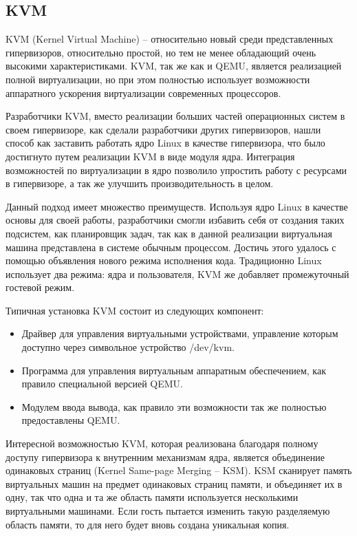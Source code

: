 \subsection{KVM}

KVM (Kernel Virtual Machine) -- относительно новый среди представленных гипервизоров,
относительно простой, но тем не менее обладающий очень высокими характеристиками. 
KVM, так же как и QEMU,
является реализацией полной виртуализации, но при этом полностью использует возможности 
аппаратного ускорения виртуализации современных процессоров.
\cite{Habib:2008:VK:1344209.1344217}

Разработчики KVM, вместо реализации больших частей операционных систем в своем
гипервизоре, как сделали разработчики других гипервизоров, нашли способ как заставить
работать ядро Linux в качестве гипервизора, что было достигнуто путем реализации
KVM в виде модуля ядра. Интеграция возможностей по виртуализации в ядро позволило
упростить работу с ресурсами в гипервизоре, а так же улучшить производительность в целом.
 
Данный подход имеет множество преимуществ. Используя ядро Linux в качестве основы для
своей работы, разработчики смогли избавить себя от создания таких подсистем, как
планировщик задач, так как в данной реализации виртуальная машина представлена в системе
обычным процессом. Достичь этого удалось с помощью объявления нового режима исполнения 
кода. Традиционно Linux использует два режима: ядра и пользователя, KVM же добавляет 
промежуточный гостевой режим.
 
Типичная установка KVM состоит из следующих компонент:

\begin{itemize}
    \item Драйвер для управления виртуальными устройствами, управление которым доступно
    через символьное устройство /dev/kvm.
    \item Программа для управления виртуальным аппаратным обеспечением, как правило
    специальной версией QEMU.
    \item Модулем ввода вывода, как правило эти возможности так же полностью предоставлены
    QEMU.
\end{itemize}

Интересной возможностью KVM, которая реализована благодаря полному доступу гипервизора
к внутренним механизмам ядра, является объединение одинаковых страниц 
(Kernel Same-page Merging -- KSM). KSM сканирует память виртуальных машин на предмет
одинаковых страниц памяти, и объединяет их в одну, так что одна и та же область памяти
используется несколькими виртуальными машинами. Если гость пытается изменить такую 
разделяемую область памяти, то для него будет вновь создана уникальная копия.

